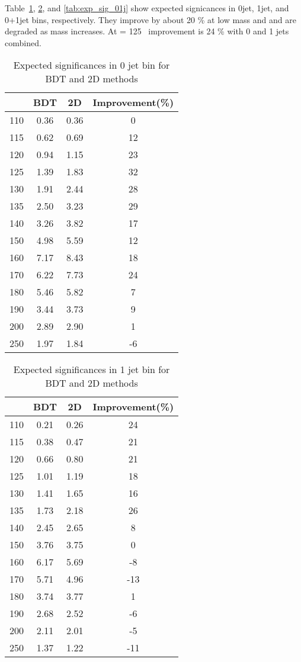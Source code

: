 Table~\ref{tab:exp_sig_0j}, \ref{tab:exp_sig_1j}, and \ref{tab:exp_sig_01j} 
show expected signicances in 0jet, 1jet, and 0+1jet bins, respectively.
They improve by about 20 \% at low mass and 
and are degraded as mass increases. 
At \mHi = 125 \GeV~improvement is 24 \% with 0 and 1 jets combined.

\begin{table}[!htb] 
	\centering
	\begin{tabular}{c | c c | c }
   	\hline \hline
	\mHi & BDT & 2D & Improvement(\%) \\
	\hline
	110	& 0.36 & 0.36 & 0	\\
	115	& 0.62 & 0.69 & 12	\\
	120	& 0.94 & 1.15 & 23 	\\
	125	& 1.39 & 1.83 & 32 	\\
	130	& 1.91 & 2.44 & 28 	\\
	135	& 2.50 & 3.23 & 29 	\\
	140	& 3.26 & 3.82 & 17 	\\
	150	& 4.98 & 5.59 & 12 	\\
	160	& 7.17 & 8.43 & 18 	\\
	170	& 6.22 & 7.73 & 24 	\\
	180	& 5.46 & 5.82 & 7 	\\
	190	& 3.44 & 3.73 & 9 	\\
	200	& 2.89 & 2.90 & 1 	\\
	250	& 1.97 & 1.84 & -6 	\\
   	\hline \hline
	\end{tabular}
	\label{tab:exp_sig_0j}
	\caption{Expected significances in 0 jet bin for BDT and 2D methods}
\end{table}


\begin{table}[!htb] 
	\centering
	\begin{tabular}{c | c c | c }
   	\hline \hline
	\mHi & BDT & 2D & Improvement(\%) \\
	\hline
	110 & 0.21 & 0.26 & 24	\\
	115 & 0.38 & 0.47 & 21	\\
	120 & 0.66 & 0.80 & 21	\\
	125 & 1.01 & 1.19 & 18	\\
	130 & 1.41 & 1.65 & 16	\\
	135 & 1.73 & 2.18 & 26	\\
	140 & 2.45 & 2.65 & 8	\\
	150 & 3.76 & 3.75 & 0	\\
	160 & 6.17 & 5.69 & -8	\\
	170 & 5.71 & 4.96 & -13	\\
	180 & 3.74 & 3.77 & 1	\\
	190 & 2.68 & 2.52 & -6	\\
	200 & 2.11 & 2.01 & -5	\\
	250 & 1.37 & 1.22 & -11	\\
   	\hline \hline
	\end{tabular}
	\label{tab:exp_sig_1j}
	\caption{Expected significances in 1 jet bin for BDT and 2D methods}
\end{table}
  

